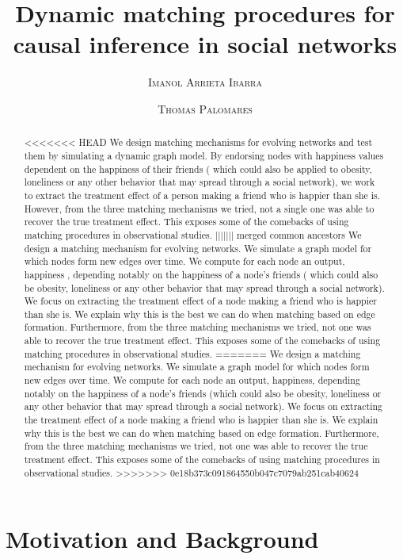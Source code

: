\documentclass[11pt]{article}
\title{Dynamic matching procedures for causal inference in social networks}
\author{{\textsc{Imanol Arrieta Ibarra}} \\
 \and {\textsc{Thomas Palomares}} \\
}
\begin{document}
\maketitle


\begin{abstract}
<<<<<<< HEAD
We design matching mechanisms for evolving networks and test them by simulating a dynamic graph model. By endorsing nodes with happiness values dependent on the happiness of their friends ( which could also be applied to obesity, loneliness or any other behavior that may spread through a social network), we work to extract the treatment effect of a person making a friend who is happier than she is. However, from the three matching mechanisms we tried, not a single one was able to recover the true treatment effect. This exposes some of the comebacks of using matching procedures in observational studies. 
||||||| merged common ancestors
We design a matching mechanism for evolving networks. We simulate a graph model for which nodes form new edges over time. We compute for each node an output, happiness , depending notably on the happiness of a node's friends ( which could also be obesity, loneliness or any other behavior that may spread through a social network). We focus on extracting the treatment effect of a node making a friend who is happier than she is. We explain why this is the best we can do when matching based on edge formation. Furthermore, from the three matching mechanisms we tried, not one was able to recover the true treatment effect. This exposes some of the comebacks of using matching procedures in observational studies. 
=======
We design a matching mechanism for evolving networks. We simulate a graph model for which nodes form new edges over time. We compute for each node an output, happiness, depending notably on the happiness of a node's friends (which could also be obesity, loneliness or any other behavior that may spread through a social network). We focus on extracting the treatment effect of a node making a friend who is happier than she is. We explain why this is the best we can do when matching based on edge formation. Furthermore, from the three matching mechanisms we tried, not one was able to recover the true treatment effect. This exposes some of the comebacks of using matching procedures in observational studies. 
>>>>>>> 0e18b373c091864550b047c7079ab251cab40624

\end{abstract}

\newpage

\section{Motivation and Background}
\end{document}
